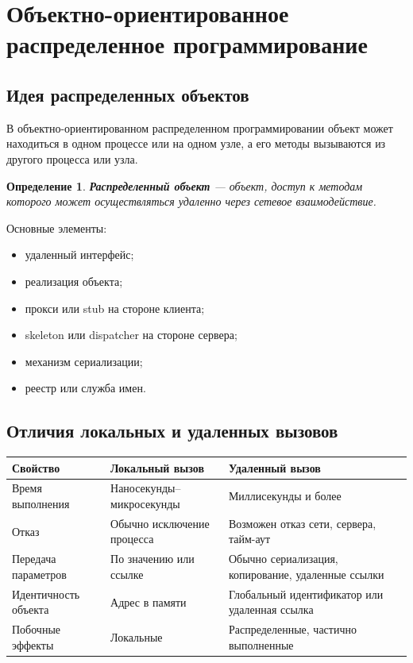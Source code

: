 \documentclass[12pt,a4paper]{article}
\newtheorem{definition}{Определение}
\begin{document}
\section{Объектно-ориентированное распределенное программирование}

\subsection{Идея распределенных объектов}

В объектно-ориентированном распределенном программировании объект может находиться в одном процессе или на одном узле, а его методы вызываются из другого процесса или узла.

\begin{definition}
\textbf{Распределенный объект} --- объект, доступ к методам которого может осуществляться удаленно через сетевое взаимодействие.
\end{definition}

Основные элементы:
\begin{itemize}
    \item удаленный интерфейс;
    \item реализация объекта;
    \item прокси или stub на стороне клиента;
    \item skeleton или dispatcher на стороне сервера;
    \item механизм сериализации;
    \item реестр или служба имен.
\end{itemize}

\subsection{Отличия локальных и удаленных вызовов}

\begin{center}
\begin{tabular}{p{}p{}p{}}
\toprule
\textbf{Свойство} & \textbf{Локальный вызов} & \textbf{Удаленный вызов} \\
\midrule
Время выполнения & Наносекунды--микросекунды & Миллисекунды и более \\
Отказ & Обычно исключение процесса & Возможен отказ сети, сервера, тайм-аут \\
Передача параметров & По значению или ссылке & Обычно сериализация, копирование, удаленные ссылки \\
Идентичность объекта & Адрес в памяти & Глобальный идентификатор или удаленная ссылка \\
Побочные эффекты & Локальные & Распределенные, частично выполненные \\
\bottomrule
\end{tabular}
\end{center}
\end{document}
